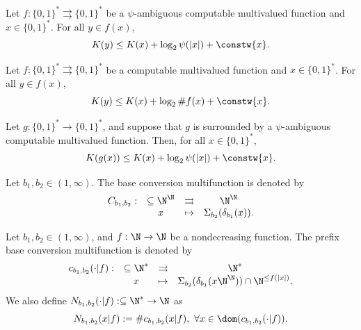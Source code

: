 \begin{theorem}
    Let $f: \{0,1\}^\ast \rightrightarrows \{0,1\}^\ast$ be a $\psi$-ambiguous computable multivalued function and $x \in \{0,1\}^\ast$. For all $y \in f(x)$,
    \begin{equation}
        K(y) \leq K(x) + \log_2 \psi(|x|) + \constw{x}.
    \end{equation}
\end{theorem}

\begin{theorem}
    Let $f: \{0,1\}^\ast \rightrightarrows \{0,1\}^\ast$ be a computable multivalued function and $x \in \{0,1\}^\ast$. For all $y \in f(x)$,
    \begin{equation}
        K(y) \leq K(x) + \log_2 \#f(x) + \constw{x}.
    \end{equation}
\end{theorem}

\begin{corollary}
    Let $g : \{0,1\}^\ast \to \{0,1\}^\ast$, and suppose that $g$ is surrounded by a $\psi$-ambiguous computable multivalued function. Then, for all $x \in \{0,1\}^\ast$,
    \begin{equation}
        K(g(x)) \leq K(x) + \log_2 \psi(|x|) + \constw{x}.
    \end{equation}
\end{corollary}


\begin{definition}
    Let $b_1,b_2 \in (1,\infty)$. The base conversion multifunction is denoted by 
    \begin{equation}
        \begin{array}{cclc}
            C_{b_1,b_2} : & \subseteq \N^\N & \rightrightarrows & \N^\N\\
            & x & \mapsto &  \Sigma_{b_2}(\delta_{b_1}(x)).
        \end{array}
    \end{equation}
\end{definition}

\begin{definition}  Let $b_1,b_2 \in (1,\infty)$, and $f : \N \to \N$ be a nondecreasing function. The prefix base conversion multifunction is denoted by 
    \begin{equation}
        \begin{array}{cclc}
            c_{b_1,b_2}(\cdot | f) : & \subseteq \N^\ast & \rightrightarrows & \N^\ast\\
            & x & \mapsto &  \Sigma_{b_2}(\delta_{b_1}(x\N^\N)) \cap \N^{\leq f(|x|)}.
        \end{array}
    \end{equation}
    We also define $N_{b_1,b_2}(\cdot|f) : \subseteq \N^\ast \to \N$ as
    \begin{equation}
        N_{b_1,b_2}(x|f) := \#c_{b_1,b_2}(x| f), \ \forall x \in \dom(c_{b_1,b_2}(\cdot|f)).
    \end{equation}
\end{definition}

